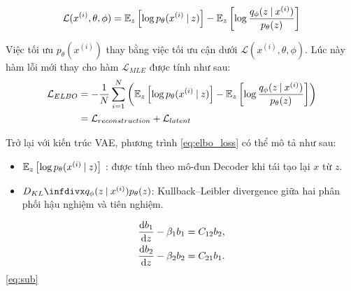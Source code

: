 \begin{align}
\mathcal{L}(x^{(i)}, \theta, \phi) = \mathbb{E}_{z} \left[\log p_\theta(x^{(i)} \:\lvert\: z) \right]
    - \mathbb{E}_{z} \left[\log \frac{q_\phi(z \:\lvert\: x^{(i)})}{p_\theta(z)} \right]
\label{eq:elbo_loss}
\end{align}



Việc tối ưu $p_\theta(x^{(i)})$ thay bằng việc tối ưu cận dưới $\mathcal{L}(x^{(i)}, \theta, \phi)$. Lúc này hàm lỗi mới thay cho hàm $\mathcal{L}_{MLE}$ được tính như sau:
\begin{align}
  \mathcal{L}_{ELBO} &= -\frac{1}{N} \sum_{i=1}^N 
  \left(
  \mathbb{E}_{z} \left[\log p_\theta(x^{(i)} \:\lvert\: z) \right]
    - \mathbb{E}_{z} \left[\log \frac{q_\phi(z \:\lvert\: x^{(i)})}{p_\theta(z)} \right]
  \right)\\
  &= \mathcal{L}_{reconstruction} + \mathcal{L}_{latent}
\end{align}

Trở lại với kiến trúc VAE, phương trình  \eqref{eq:elbo_loss} 
có thể mô tả như sau:
\begin{itemize}
    \item $\mathbb{E}_{z} \left[\log p_\theta(x^{(i)} \:\lvert\: z) \right]$ : được tính theo mô-đun Decoder khi tái tạo lại $x$ từ $z$.
    \item $\Dkl{q_\phi(z \given x^{(i)})}{p_\theta(z)}$: Kullback–Leibler divergence giữa hai phân phối hậu nghiệm và tiên nghiệm.
\end{itemize}


\begin{subequations}\label{eq:sub}
	\noeqref{eq:1,eq:2}
	\begin{gather}
	\frac{\text{d}b_1}{\text{d}z} - \beta_1b_1 = C_{12}b_2,\label{eq:1}\\
	\frac{\text{d}b_2}{\text{d}z} - \beta_2b_2 = C_{21}b_1.\label{eq:2}
	\end{gather}
\end{subequations}
\eqref{eq:sub}


